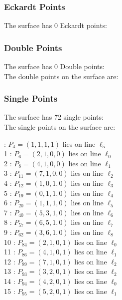 \documentclass{article}
\begin{document}
{\subsubsection*{Eckardt Points}
The surface has 0 Eckardt points:\\
\subsubsection*{Double Points}
The surface has 0 Double points:\\
The double points on the surface are:\\
\begin{multicols}{2}
\noindent
\end{multicols}
\subsubsection*{Single Points}
The surface has 72 single points:\\
The single points on the surface are:\\
\begin{multicols}{2}
 : $P_{4}=( 1, 1, 1, 1 )$ lies on line $\ell_{5}$\\
1 : $P_{6}=( 2, 1, 0, 0 )$ lies on line $\ell_{0}$\\
2 : $P_{8}=( 4, 1, 0, 0 )$ lies on line $\ell_{1}$\\
3 : $P_{11}=( 7, 1, 0, 0 )$ lies on line $\ell_{2}$\\
4 : $P_{12}=( 1, 0, 1, 0 )$ lies on line $\ell_{3}$\\
5 : $P_{19}=( 0, 1, 1, 0 )$ lies on line $\ell_{4}$\\
6 : $P_{20}=( 1, 1, 1, 0 )$ lies on line $\ell_{5}$\\
7 : $P_{40}=( 5, 3, 1, 0 )$ lies on line $\ell_{6}$\\
8 : $P_{57}=( 6, 5, 1, 0 )$ lies on line $\ell_{7}$\\
9 : $P_{62}=( 3, 6, 1, 0 )$ lies on line $\ell_{8}$\\
10 : $P_{84}=( 2, 1, 0, 1 )$ lies on line $\ell_{0}$\\
11 : $P_{86}=( 4, 1, 0, 1 )$ lies on line $\ell_{1}$\\
12 : $P_{89}=( 7, 1, 0, 1 )$ lies on line $\ell_{2}$\\
13 : $P_{93}=( 3, 2, 0, 1 )$ lies on line $\ell_{2}$\\
14 : $P_{94}=( 4, 2, 0, 1 )$ lies on line $\ell_{0}$\\
15 : $P_{95}=( 5, 2, 0, 1 )$ lies on line $\ell_{1}$\\

\end{multicols}}
\end{document}
